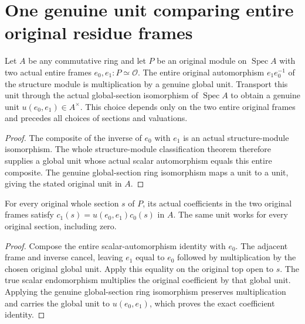 \section{One genuine unit comparing entire original residue frames}

\begin{definition}\label{def:fc-original-frame-transition-unit}
\leanok
{}
Let $A$ be any commutative ring and let $P$ be an original module
on $\operatorname{Spec}A$ with two actual entire frames
$e_0,e_1:P\simeq\mathcal O$. The entire original automorphism
$e_1e_0^{-1}$ of the structure module is multiplication by a genuine
global unit. Transport this unit through the actual global-section
isomorphism of $\operatorname{Spec}A$ to obtain a genuine unit
$u(e_0,e_1)\in A^\times$. This choice depends only on the two entire
original frames and precedes all choices of sections and valuations.
\end{definition}
\begin{proof}
The composite of the inverse of $e_0$ with $e_1$ is an actual
structure-module isomorphism. The whole structure-module
classification theorem therefore supplies a global unit whose
actual scalar automorphism equals this entire composite. The
genuine global-section ring isomorphism maps a unit to a unit,
giving the stated original unit in $A$.
\end{proof}

\begin{lemma}\label{lem:fc-original-frame-transition-coefficient}
\leanok
{}
For every original whole section $s$ of $P$, its actual coefficients
in the two original frames satisfy $c_1(s)=u(e_0,e_1)c_0(s)$ in $A$.
The same unit works for every original section, including zero.
\end{lemma}
\begin{proof}
Compose the entire scalar-automorphism identity with $e_0$.
The adjacent frame and inverse cancel, leaving $e_1$ equal to
$e_0$ followed by multiplication by the chosen original global
unit. Apply this equality on the original top open to $s$.
The true scalar endomorphism multiplies the original coefficient
by that global unit. Applying the genuine global-section ring
isomorphism preserves multiplication and carries the global unit
to $u(e_0,e_1)$, which proves the exact coefficient identity.
\end{proof}

